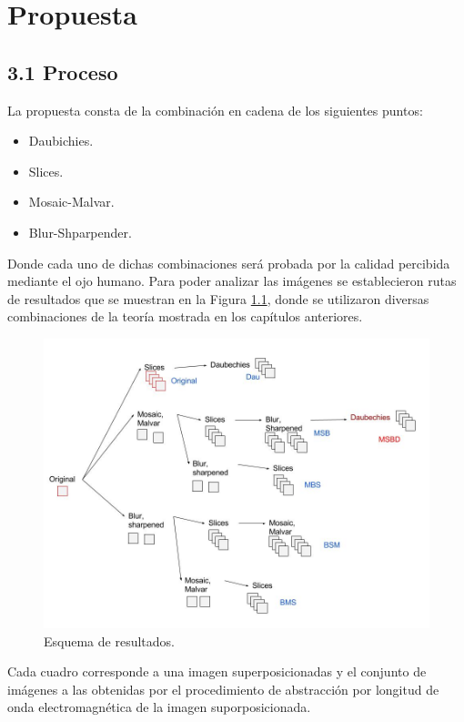 \chapter{Propuesta} %
\label{Capitulo3} %

\section{3.1 Proceso}
La propuesta consta de la combinación en cadena de los siguientes puntos:
\begin{itemize}
\item Daubichies.
\item Slices.
\item Mosaic-Malvar.
\item Blur-Shparpender.
\end{itemize}

Donde cada uno de dichas combinaciones será probada por la calidad percibida mediante el ojo humano. 
Para poder analizar las imágenes se establecieron rutas de resultados que se muestran en la Figura \ref{pics:squeme}, donde se utilizaron diversas combinaciones de la teoría mostrada en los capítulos anteriores.
\clearpage
\begin{figure}[h]
\includegraphics[scale=.4]{./images/RESULTS/squeme.jpg}
\caption{Esquema de resultados.}
\label{pics:squeme}
\end{figure}
Cada cuadro corresponde a una imagen superposicionadas y el conjunto de imágenes a las obtenidas por el procedimiento de abstracción por longitud de onda electromagnética de la imagen suporposicionada. 